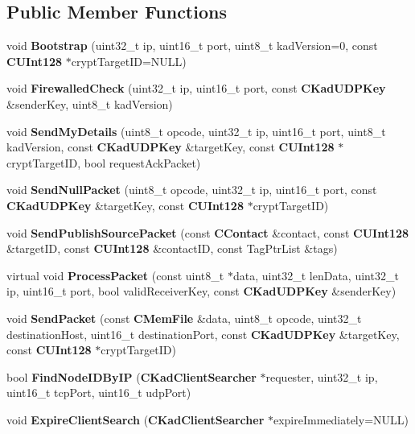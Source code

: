 \subsection*{Public Member Functions}
\begin{DoxyCompactItemize}
\item 
void {\bfseries Bootstrap} (uint32\_\-t ip, uint16\_\-t port, uint8\_\-t kadVersion=0, const {\bf CUInt128} $\ast$cryptTargetID=NULL)\label{classKademlia_1_1CKademliaUDPListener_ae1d2a1de8e64c745ca50b059f2b9cf11}

\item 
void {\bfseries FirewalledCheck} (uint32\_\-t ip, uint16\_\-t port, const {\bf CKadUDPKey} \&senderKey, uint8\_\-t kadVersion)\label{classKademlia_1_1CKademliaUDPListener_a84e05f527655f9a8de62a7fa34c8b8b2}

\item 
void {\bfseries SendMyDetails} (uint8\_\-t opcode, uint32\_\-t ip, uint16\_\-t port, uint8\_\-t kadVersion, const {\bf CKadUDPKey} \&targetKey, const {\bf CUInt128} $\ast$cryptTargetID, bool requestAckPacket)\label{classKademlia_1_1CKademliaUDPListener_a84fdaf862521d939e851964a59bb234d}

\item 
void {\bfseries SendNullPacket} (uint8\_\-t opcode, uint32\_\-t ip, uint16\_\-t port, const {\bf CKadUDPKey} \&targetKey, const {\bf CUInt128} $\ast$cryptTargetID)\label{classKademlia_1_1CKademliaUDPListener_aa056d189319f1848c15874e5e7c52405}

\item 
void {\bfseries SendPublishSourcePacket} (const {\bf CContact} \&contact, const {\bf CUInt128} \&targetID, const {\bf CUInt128} \&contactID, const TagPtrList \&tags)\label{classKademlia_1_1CKademliaUDPListener_a9df49c55c61c498d81a19ddb2f06de41}

\item 
virtual void {\bfseries ProcessPacket} (const uint8\_\-t $\ast$data, uint32\_\-t lenData, uint32\_\-t ip, uint16\_\-t port, bool validReceiverKey, const {\bf CKadUDPKey} \&senderKey)\label{classKademlia_1_1CKademliaUDPListener_af65bfcc72ca22a814d4a4c5ba8df0489}

\item 
void {\bfseries SendPacket} (const {\bf CMemFile} \&data, uint8\_\-t opcode, uint32\_\-t destinationHost, uint16\_\-t destinationPort, const {\bf CKadUDPKey} \&targetKey, const {\bf CUInt128} $\ast$cryptTargetID)\label{classKademlia_1_1CKademliaUDPListener_aa2dcb4c254b9a90bd47af84f1ee8d77c}

\item 
bool {\bfseries FindNodeIDByIP} ({\bf CKadClientSearcher} $\ast$requester, uint32\_\-t ip, uint16\_\-t tcpPort, uint16\_\-t udpPort)\label{classKademlia_1_1CKademliaUDPListener_aff12f3003cd5affe84f1c021d0dceeb3}

\item 
void {\bfseries ExpireClientSearch} ({\bf CKadClientSearcher} $\ast$expireImmediately=NULL)\label{classKademlia_1_1CKademliaUDPListener_a013cb8ec2063914eefb5610260ef85c9}

\end{DoxyCompactItemize}
